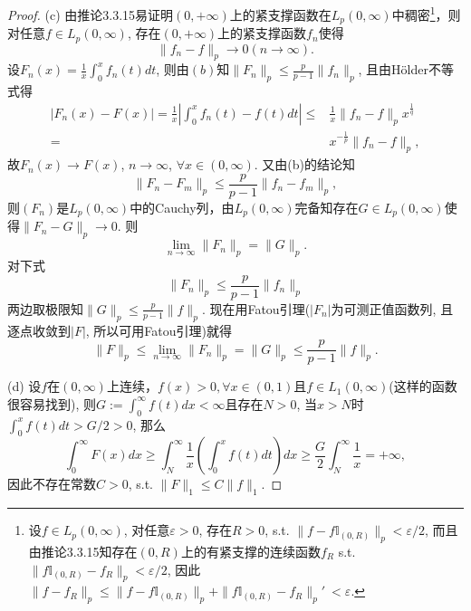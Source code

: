 \documentclass[a4paper,8pt]{ctexart}\textwidth 140mm \textheight 216mm
\newcommand{\e}{\varepsilon}
\newcommand{\8}{\infty}
\begin{document}
\begin{proof}
	(c) 由推论3.3.15易证明$(0,+\infty)$上的紧支撑函数在$L_p(0,\infty)$中稠密\footnote{设$f\in L_p(0,\infty)$, 对任意$\e>0$, 存在$R>0$, s.t. $\|f-f\mathbb{I}_{(0,R)}\|_p<\e/2$, 而且由推论3.3.15知存在$(0,R)$上的有紧支撑的连续函数$f_R$ s.t.$\|f\mathbb{I}_{(0,R)}-f_R\|_p<\e/2$, 因此$\|f-f_R\|_p\leq\|f-f\mathbb{I}_{(0,R)}\|_p+\|f\mathbb{I}_{(0,R)}-f_R\|_p'\
		<\e$.}，则对任意$f\in L_p(0,\infty)$, 存在$(0,+\infty)$上的紧支撑函数$f_n$使得
	$$\|f_n-f\|_p\to0(n\to\infty).$$
	设$F_n(x)=\frac{1}{x}\int_0^xf_n(t)dt$, 则由$(b)$知$\|F_n\|_p\leq\frac{p}{p-1}\|f_n\|_p$, 且由H\"older不等式得
	\begin{equation*}
		\begin{split}
		|F_n(x)-F(x)|=\frac{1}{x}|\int_0^xf_n(t)-f(t)dt|\leq& \frac{1}{x}\|f_n-f\|_px^{\frac{1}{q}}\\
		=&x^{-\frac{1}{p}}\|f_n-f\|_p,
		\end{split}
	\end{equation*}
	故$F_n(x)\to F(x)$, $n\to\infty$, $\forall x\in(0,\infty)$. 又由(b)的结论知
	\begin{equation*}
		\|F_n-F_m\|_p\leq \frac{p}{p-1}\|f_n-f_m\|_p,
	\end{equation*}
	则$(F_n)$是$L_p(0,\infty)$中的Cauchy列，由$L_p(0,\infty)$完备知存在$G\in L_p(0,\infty)$使得\mbox{$\|F_n-G\|_p\to 0$}. 则
	$$\lim_{n\to\infty}\|F_n\|_p=\|G\|_p.$$
	对下式
	$$\|F_n\|_p\leq \frac{p}{p-1}\|f_n\|_p$$
	两边取极限知$\|G\|_p\leq \frac{p}{p-1}\|f\|_p$. 现在用Fatou引理($|F_n|$为可测正值函数列, 且逐点收敛到$|F|$, 所以可用Fatou引理)就得
	\begin{equation*}
		\|F\|_p\leq \lim_{n\to\infty}\|F_n\|_p=\|G\|_p\leq \frac{p}{p-1}\|f\|_p.
	\end{equation*}
	
	(d) 设$f$在$(0,\infty)$上连续，$f(x)>0,\forall x\in(0,1)$且$f\in L_1(0,\infty)$(这样的函数很容易找到), 则$G:=\int_0^{\infty}f(t)dx<\infty$且存在$N>0$, 当$x>N$时$\int_0^x f(t)dt>G/2>0$, 那么
	\begin{equation*}
		\int_0^\infty F(x)dx\geq\int_N^{\infty}\frac{1}{x}(\int_0^x f(t)dt)dx\geq \frac{G}{2}\int_N^\infty \frac{1}{x}=+\infty,
	\end{equation*}
	因此不存在常数$C>0$, s.t.
	$\|F\|_1\leq C\|f\|_1$.
	

\end{proof}
\end{document}
